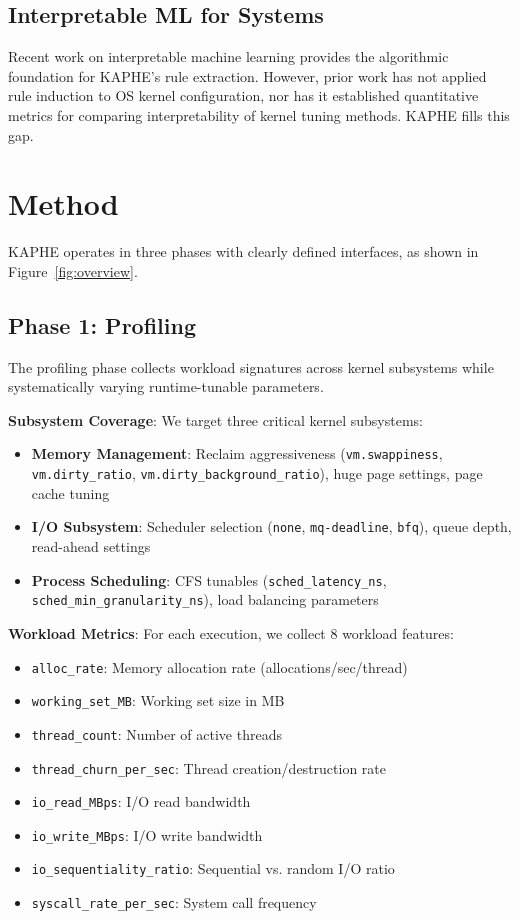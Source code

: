 \documentclass[11pt,a4paper]{article}
\begin{document}
\subsection{Interpretable ML for Systems}

Recent work on interpretable machine learning \citep{cohen1995ripper} provides the algorithmic foundation for KAPHE's rule extraction. However, prior work has not applied rule induction to OS kernel configuration, nor has it established quantitative metrics for comparing interpretability of kernel tuning methods. KAPHE fills this gap.

\section{Method}
\label{sec:method}

KAPHE operates in three phases with clearly defined interfaces, as shown in Figure~\ref{fig:overview}.

\subsection{Phase 1: Profiling}

The profiling phase collects workload signatures across kernel subsystems while systematically varying runtime-tunable parameters.

\textbf{Subsystem Coverage}: We target three critical kernel subsystems:
\begin{itemize}
    \item \textbf{Memory Management}: Reclaim aggressiveness (\texttt{vm.swappiness}, \texttt{vm.dirty\_ratio}, \texttt{vm.dirty\_background\_ratio}), huge page settings, page cache tuning
    \item \textbf{I/O Subsystem}: Scheduler selection (\texttt{none}, \texttt{mq-deadline}, \texttt{bfq}), queue depth, read-ahead settings
    \item \textbf{Process Scheduling}: CFS tunables (\texttt{sched\_latency\_ns}, \texttt{sched\_min\_granularity\_ns}), load balancing parameters
\end{itemize}

\textbf{Workload Metrics}: For each execution, we collect 8 workload features:
\begin{itemize}
    \item \texttt{alloc\_rate}: Memory allocation rate (allocations/sec/thread)
    \item \texttt{working\_set\_MB}: Working set size in MB
    \item \texttt{thread\_count}: Number of active threads
    \item \texttt{thread\_churn\_per\_sec}: Thread creation/destruction rate
    \item \texttt{io\_read\_MBps}: I/O read bandwidth
    \item \texttt{io\_write\_MBps}: I/O write bandwidth
    \item \texttt{io\_sequentiality\_ratio}: Sequential vs. random I/O ratio
    \item \texttt{syscall\_rate\_per\_sec}: System call frequency
\end{itemize}
\end{document}
